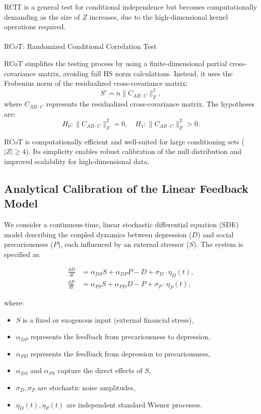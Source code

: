 \documentclass[
]{article}
\makeatletter
\let\oldparagraph\paragraph
\renewcommand{\paragraph}{
    \@ifstar
      \xxxParagraphStar
      \xxxParagraphNoStar
  }
\newcommand{\xxxParagraphStar}[1]{\oldparagraph*{#1}\mbox{}}
\newcommand{\xxxParagraphNoStar}[1]{\oldparagraph{#1}\mbox{}}
\providecommand{\tightlist}{%
  \setlength{\itemsep}{0pt}\setlength{\parskip}{0pt}}\usepackage{longtable,booktabs,array}
\makeatother
\begin{document}
RCIT is a general test for conditional independence but becomes
computationally demanding as the size of \(Z\) increases, due to the
high-dimensional kernel operations required.

\paragraph{RCoT: Randomized Conditional Correlation
Test}\label{rcot-randomized-conditional-correlation-test}

RCoT simplifies the testing process by using a finite-dimensional
partial cross-covariance matrix, avoiding full HS norm calculations.
Instead, it uses the Frobenius norm of the residualized cross-covariance
matrix: \[
S' = n \|C_{AB \cdot C}\|_F^2,
\] where \(C_{AB \cdot C}\) represents the residualized cross-covariance
matrix. The hypotheses are: \[
H_0: \|C_{AB \cdot C}\|_F^2 = 0, \quad H_1: \|C_{AB \cdot C}\|_F^2 > 0.
\]

RCoT is computationally efficient and well-suited for large conditioning
sets (\(|Z| \geq 4\)). Its simplicity enables robust calibration of the
null distribution and improved scalability for high-dimensional data.

\subsection{Analytical Calibration of the Linear Feedback
Model}\label{sec-analcalibration}

We consider a continuous-time, linear stochastic differential equation
(SDE) model describing the coupled dynamics between depression (\(D\))
and social precariousness (\(P\)), each influenced by an external
stressor (\(S\)). The system is specified as:

\[
\begin{aligned}
\frac{dD}{dt} &= \alpha_{DS} S + \alpha_{DP} P - D + \sigma_D \cdot \eta_D(t), \\
\frac{dP}{dt} &= \alpha_{PS} S + \alpha_{PD} D - P + \sigma_P \cdot \eta_P(t),
\end{aligned}
\]

where:

\begin{itemize}
\tightlist
\item
  \(S\) is a fixed or exogenous input (external financial stress),
\item
  \(\alpha_{DP}\) represents the feedback from precariousness to
  depression,
\item
  \(\alpha_{PD}\) represents the feedback from depression to
  precariousness,
\item
  \(\alpha_{DS}\) and \(\alpha_{PS}\) capture the direct effects of
  \(S\),
\item
  \(\sigma_D, \sigma_P\) are stochastic noise amplitudes,
\item
  \(\eta_D(t), \eta_P(t)\) are independent standard Wiener processes.
\end{itemize}
\end{document}
